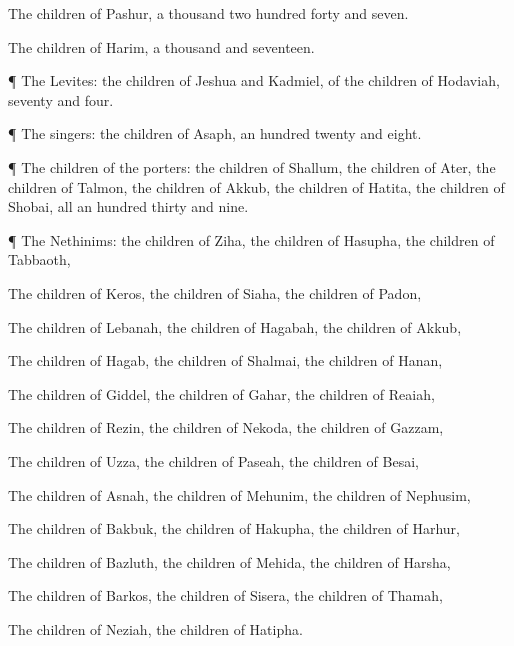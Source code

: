 {The
children of
Pashur, a
thousand two
hundred
forty and
seven.

The
children of
Harim, a
thousand and
seventeen.


\par }{\PP {}¶ The
Levites: the
children of
Jeshua and
Kadmiel, of the
children of
Hodaviah,
seventy and
four.


\par }{\PP {}¶ The
singers: the
children of
Asaph, an
hundred
twenty and
eight.


\par }{\PP {}¶ The
children of the
porters: the
children of
Shallum, the
children of
Ater, the
children of
Talmon, the
children of
Akkub, the
children of
Hatita, the
children of
Shobai,
{} all an
hundred
thirty and
nine.


\par }{\PP {}¶ The
Nethinims: the
children of
Ziha, the
children of
Hasupha, the
children of
Tabbaoth,

The
children of
Keros, the
children of
Siaha, the
children of
Padon,

The
children of
Lebanah, the
children of
Hagabah, the
children of
Akkub,

The
children of
Hagab, the
children of
Shalmai, the
children of
Hanan,

The
children of
Giddel, the
children of
Gahar, the
children of
Reaiah,

The
children of
Rezin, the
children of
Nekoda, the
children of
Gazzam,

The
children of
Uzza, the
children of
Paseah, the
children of
Besai,

The
children of
Asnah, the
children of
Mehunim, the
children of
Nephusim,

The
children of
Bakbuk, the
children of
Hakupha, the
children of
Harhur,

The
children of
Bazluth, the
children of
Mehida, the
children of
Harsha,

The
children of
Barkos, the
children of
Sisera, the
children of
Thamah,

The
children of
Neziah, the
children of
Hatipha.


}
